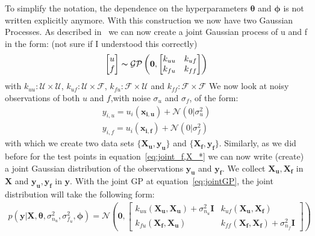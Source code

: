 \documentclass{article}
\begin{document}
To simplify the notation, the dependence on the hyperparameters $\bm{\theta}$ and $\bm{\phi}$ is not written explicitly anymore.
With this construction we now have two Gaussian Processes. As described in~\cite{garnett_2023_full} we can now create a joint Gaussian process of u and f in the form: (not sure if I understood this correctly)
\begin{equation}
    \label{eq:jointGP}
    \begin{aligned}
        \begin{bmatrix}
            u \\
            f
        \end{bmatrix}
    \end{aligned}
    \thicksim \mathcal{GP}\left(\bm{0},
    \begin{bmatrix}
        k_{uu} & k_{uf} \\
        k_{fu} & k_{ff}
    \end{bmatrix}\right)
\end{equation}
with $k_{uu}: \mathcal{U} \times  \mathcal{U}$, $k_{uf}: \mathcal{U} \times  \mathcal{F}$, $k_{fu}: \mathcal{F} \times  \mathcal{U}$ and $k_{ff}: \mathcal{F} \times  \mathcal{F}$
We now look at noisy observations of both $u$ and $f$,with noise $\sigma_u$ and $\sigma_f$, of the form:
\begin{equation}
    \begin{aligned}
        y_{i,u} = u_i(\bm{x_{i,u}}) + \mathcal{N}(0|\sigma_u^2) \\
        y_{i,f} = u_i(\bm{x_{i,f}}) + \mathcal{N}(0|\sigma_f^2)
    \end{aligned}
\end{equation}
with which we create two data sets $\{\bm{X_u,y_u}\}$ and $\{\bm{X_f,y_f}\}$. Similarly, as we did before for the test points in equation~\ref{eq:joint_f,X_*} we can now write (create) a joint Gaussian distribution of the observations $\bm{y_u}$ and $\bm{y_f}$. We collect $\bm{X_u,X_f}$ in $\bm{X}$ and $\bm{y_u,y_f}$ in $\bm{y}$. With the joint GP at equation~\ref{eq:jointGP}, the joint distribution will take the following form:
\begin{equation}
    \label{eq:jointGP_observations}
    \begin{aligned}
        p(\bm{y}|\bm{X},\bm{\theta},\sigma_{n_u}^2,\sigma_{f_u}^2,\bm{\phi}) =
        \mathcal{N}\left(\bm{0},
        \begin{bmatrix}
            k_{uu}(\bm{X_u,X_u}) + \sigma_{n_u}^2 \bm{I} & k_{uf}(\bm{X_u,X_f})                         \\
            k_{fu}(\bm{X_f,X_u})                         & k_{ff}(\bm{X_f,X_f}) + \sigma_{n_f}^2 \bm{I}
        \end{bmatrix}\right)
    \end{aligned}
\end{equation}
\end{document}

